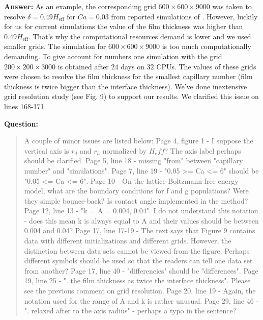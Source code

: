 \documentclass{article}
\begin{document}
\textbf{Answer:} As an example, the corresponding grid $600\times600\times9000$ was taken to resolve
$\delta=0.49 H_{\mathrm{eff}}$ for $Ca=0.03$ from reported simulations of \citet{heil-threedim}.
However, luckily for us for current simulations the value of the film thickness was higher
than $0.49 H_{\mathrm{eff}}$. That's why the computational resources demand is lower and we used
smaller grids. The simulation for $600\times 600 \times 9000$ is too much computationally demanding.
To give account for numbers one simulation with the grid $200\times200\times 3000$ is obtained after
$24$ days on $32$ CPUs. The values of these grids were chosen to resolve the film thickness for the
smallest capillary number (film thickness is twice bigger than the interface thickness). We've done
inextensive grid resolution study (see Fig. 9) to support our results.  We clarified
this issue on lines 168-171. 

\textbf{Question:}
\begin{quotation}
A couple of minor issues are listed below:
Page 4, figure 1 - I suppose the vertical axis is $r_d$ and $r_h$ normalized by $H_eff$?  The axis
label perhaps should be clarified.
Page 5, line 18 - missing "from" between "capillary number" and "simulations".
Page 7, line 19 - "0.05 >= Ca <= 6" should be "0.05 <= Ca <= 6".
Page 10 - On the lattice Boltzmann free energy model, what are the boundary conditions for f and g
populations?  Were they simple bounce-back?  Is contact angle implemented in the method?
Page 12, line 13 - "k = A = 0.004, 0.04".  I do not understand this notation - does this mean k is
always equal to A and their values should be between 0.004 and 0.04?
Page 17, line 17-19 - The text says that Figure 9 contains data with different initializations and
different grids.  However, the distinction between data sets cannot be viewed from the figure. 
Perhaps different symbols should be used so that the readers can tell one data set from another?
Page 17, line 40 - "differencies" should be "differences".
Page 19, line 25 - ". the film thickness as twice the interface thickness".  Please see the previous
comment on grid resolution.
Page 20, line 19 - Again, the notation used for the range of A and k is rather unusual.
Page 29, line 46 - ". relaxed after to the axis radius" - perhaps a typo in the sentence?
\end{quotation}
\end{document}
